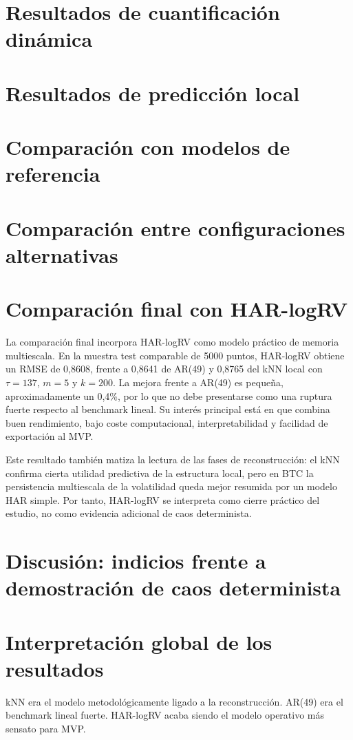 \section{Resultados de cuantificación dinámica}\label{sec:resultados-cuantificacion}

\section{Resultados de predicción local}\label{sec:resultados-prediccion}

\section{Comparación con modelos de referencia}\label{sec:comparacion-referencia}

\section{Comparación entre configuraciones alternativas}\label{sec:comparacion-configuraciones}

\section{Comparación final con HAR-logRV}\label{sec:resultados-har}
La comparación final incorpora HAR-logRV como modelo práctico de memoria multiescala. En la muestra test comparable de 5000 puntos, HAR-logRV obtiene un RMSE de 0,8608, frente a 0,8641 de AR(49) y 0,8765 del kNN local con \(\tau=137\), \(m=5\) y \(k=200\). La mejora frente a AR(49) es pequeña, aproximadamente un 0,4\%, por lo que no debe presentarse como una ruptura fuerte respecto al benchmark lineal. Su interés principal está en que combina buen rendimiento, bajo coste computacional, interpretabilidad y facilidad de exportación al MVP.

Este resultado también matiza la lectura de las fases de reconstrucción: el kNN confirma cierta utilidad predictiva de la estructura local, pero en BTC la persistencia multiescala de la volatilidad queda mejor resumida por un modelo HAR simple. Por tanto, HAR-logRV se interpreta como cierre práctico del estudio, no como evidencia adicional de caos determinista.

\section{Discusión: indicios frente a demostración de caos determinista}\label{sec:discusion-caos}

\section{Interpretación global de los resultados}\label{sec:interpretacion-global}

kNN era el modelo metodológicamente ligado a la reconstrucción.
AR(49) era el benchmark lineal fuerte.
HAR-logRV acaba siendo el modelo operativo más sensato para MVP.
